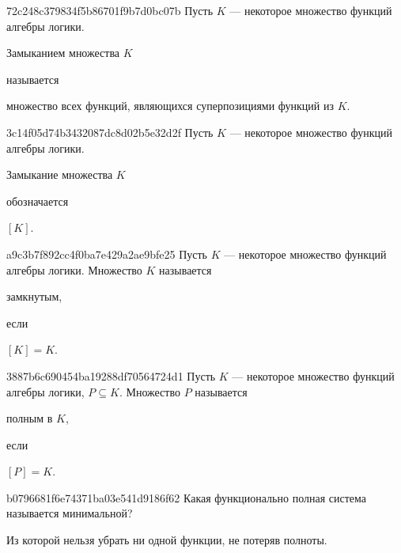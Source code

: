 \begin{note}{72c248c379834f5b86701f9b7d0bc07b}
    Пусть \({ K }\) --- некоторое множество функций алгебры логики.
    \begin{icloze}{2}Замыканием множества \({ K }\)\end{icloze} называется \begin{icloze}{1}множество всех функций, являющихся суперпозициями функций из \({ K }\).\end{icloze}
\end{note}

\begin{note}{3c14f05d74b3432087dc8d02b5e32d2f}
    Пусть \({ K }\) --- некоторое множество функций алгебры логики.
    \begin{icloze}{2}Замыкание множества \({ K }\)\end{icloze} обозначается \begin{icloze}{1}\({ \left[ K \right] }\).\end{icloze}
\end{note}

\begin{note}{a9c3b7f892cc4f0ba7e429a2ae9bfe25}
    Пусть \({ K }\) --- некоторое множество функций алгебры логики.
    Множество \({ K }\) называется \begin{icloze}{2}замкнутым,\end{icloze} если \begin{icloze}{1}\({ [K] = K }\).\end{icloze}
\end{note}

\begin{note}{3887b6c690454ba19288df70564724d1}
    Пусть \({ K }\) --- некоторое множество функций алгебры логики, \({ P \subseteq K }\).
    Множество \({ P }\) называется \begin{icloze}{2}полным в \({ K }\),\end{icloze} если \begin{icloze}{1}\({ \left[ P \right] = K }\).\end{icloze}
\end{note}

\begin{note}{b0796681f6e74371ba03e541d9186f62}
    Какая функционально полная система называется минимальной?

    \begin{cloze}{1}
        Из которой нельзя убрать ни одной функции, не потеряв полноты.
    \end{cloze}
\end{note}

